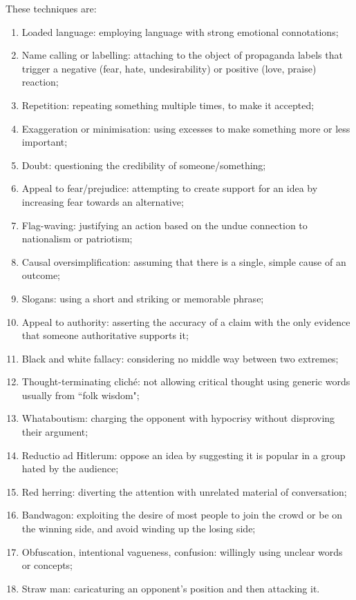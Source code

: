 These techniques are:
\begin{enumerate}
    \item Loaded language: employing language with strong emotional connotations;
    \item Name calling or labelling: attaching to the object of propaganda labels that trigger a negative (fear, hate, undesirability) or positive (love, praise) reaction;
    \item Repetition: repeating something multiple times, to make it accepted;
    \item Exaggeration or minimisation: using excesses to make something more or less important;
    \item Doubt: questioning the credibility of someone/something;
    \item Appeal to fear/prejudice: attempting to create support for an idea by increasing fear towards an alternative;
    \item Flag-waving: justifying an action based on the undue connection to nationalism or patriotism;
    \item Causal oversimplification: assuming that there is a single, simple cause of an outcome;
    \item Slogans: using a short and striking or memorable phrase;
    \item Appeal to authority: asserting the accuracy of a claim with the only evidence that someone authoritative supports it;
    \item Black and white fallacy: considering no middle way between two extremes;
    \item Thought-terminating cliché: not allowing critical thought using generic words usually from ``folk wisdom";
    \item Whataboutism: charging the opponent with hypocrisy without disproving their argument;
    \item Reductio ad Hitlerum: oppose an idea by suggesting it is popular in a group hated by the audience;
    \item Red herring: diverting the attention with unrelated material of conversation;
    \item Bandwagon: exploiting the desire of most people to join the crowd or be on the winning side, and avoid winding up the losing side;
    \item Obfuscation, intentional vagueness, confusion: willingly using unclear words or concepts; 
    \item Straw man: caricaturing an opponent's position and then attacking it.
\end{enumerate}


